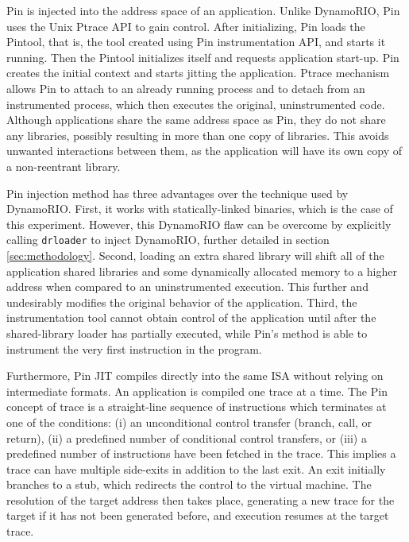 \documentclass[11pt,twoside]{article}
\begin{document}
  Pin is injected into the address space of an application. Unlike
  DynamoRIO, Pin uses the Unix Ptrace API to gain control. After
  initializing, Pin loads the Pintool, that is,
  the tool created using Pin instrumentation API, 
  and starts it running. Then the Pintool
  initializes itself and requests application
  start-up. Pin creates the initial context and starts jitting
  the application. Ptrace mechanism allows Pin to attach to
  an already running process and to detach from an instrumented
  process, which then executes the original, uninstrumented code.
  Although applications share the same address space as Pin, they
  do not share any libraries, possibly resulting in more than
  one copy of libraries. This avoids unwanted interactions between
  them, as the application will have its own copy of a
  non-reentrant library.

  Pin injection method has three advantages over the technique
  used by DynamoRIO.
  First, it works with statically-linked binaries, which is the
  case of this experiment. However, this
  DynamoRIO flaw can be overcome by
  explicitly calling {\tt drloader} to inject DynamoRIO, further
  detailed in section \ref{sec:methodology}.
  Second, loading an extra shared library will shift all of the
  application shared libraries and some dynamically allocated
  memory to a higher address when compared to an uninstrumented
  execution. This further and undesirably modifies the
  original behavior of the application. Third, the instrumentation
  tool cannot obtain control of the application until after the
  shared-library loader has partially executed, while Pin's
  method is able to instrument the very first instruction in the
  program.

  Furthermore, Pin JIT compiles directly into the same ISA without
  relying on intermediate formats. An application is compiled
  one trace at a time. The Pin concept of trace is a
  straight-line sequence of instructions which terminates at one
  of the conditions: (i) an unconditional control transfer (branch,
  call, or return), (ii) a predefined number of conditional
  control transfers, or (iii) a predefined number of instructions
  have been fetched in the trace. This implies a trace can
  have multiple side-exits in addition to the last exit. An exit
  initially branches to a stub, which redirects the control to
  the virtual machine. The resolution of the target address then
  takes place, generating a new trace for the target if it has
  not been generated before, and execution resumes at the target
  trace.
\end{document}
